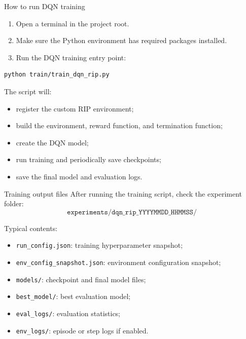 \documentclass[aspectratio=169]{beamer}
\begin{document}
\begin{frame}[fragile]{How to run DQN training}
\begin{enumerate}
    \item Open a terminal in the project root.
    \vspace{0.18cm}
    \item Make sure the Python environment has required packages installed.
    \vspace{0.18cm}
    \item Run the DQN training entry point:
\end{enumerate}

\begin{lstlisting}[basicstyle=\ttfamily\small]
python train/train_dqn_rip.py
\end{lstlisting}

\vspace{0.15cm}
The script will:
\begin{itemize}
    \item register the custom RIP environment;
    \item build the environment, reward function, and termination function;
    \item create the DQN model;
    \item run training and periodically save checkpoints;
    \item save the final model and evaluation logs.
\end{itemize}
\end{frame}

\begin{frame}{Training output files}
After running the training script, check the experiment folder:
\[
\texttt{experiments/dqn\_rip\_YYYYMMDD\_HHMMSS/}
\]

\vspace{0.15cm}
Typical contents:
\begin{itemize}
    \item \texttt{run\_config.json}: training hyperparameter snapshot;
    \vspace{0.15cm}
    \item \texttt{env\_config\_snapshot.json}: environment configuration snapshot;
    \vspace{0.15cm}
    \item \texttt{models/}: checkpoint and final model files;
    \vspace{0.15cm}
    \item \texttt{best\_model/}: best evaluation model;
    \vspace{0.15cm}
    \item \texttt{eval\_logs/}: evaluation statistics;
    \vspace{0.15cm}
    \item \texttt{env\_logs/}: episode or step logs if enabled.
\end{itemize}
\end{frame}
\end{document}
